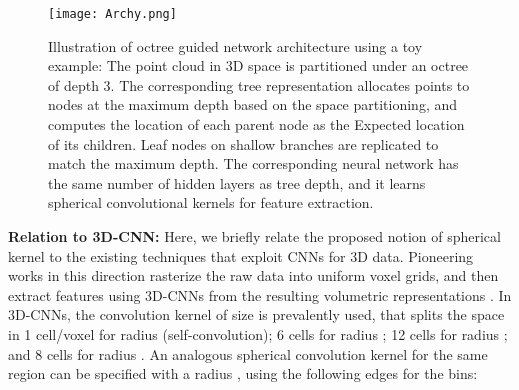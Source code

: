 \documentclass[10pt,twocolumn,letterpaper]{article}
\begin{document}
\begin{comment}
\begin{figure}
  \centering
   {\texttt{[image: lemma\_examples.png]}\label{LemmaExamples}}
  \caption{{\color{blue}Examples of divisions that violate the asymmetry. Here the red cross  represents the target point, while the green cross  is one of its neighborhood. The magenta sphere represents the spherical neighborhood range of , and the black curves represent divisions along / directions.
  (a) The spherical space is not divided at all, which results in a single weight matrix to be defined in the kernel and applied to any two points  and  symmetrically. (b) 
  Let . There will be no divisions along the  direction, which results in a particular weight matrix to be symmetrically applied to 
  points  and  on the - or its parallels (the blue arrow line). (c) 
  Let , that is, . The  direction will be divided into two bins, which subtly results in   
points ,  on the - and its parallels to share weights in a certain bin with  symmetrically.}} 
\end{figure}
\end{comment}
\begin{figure*}
  \centering
 {\texttt{[image: Archy.png]}\label{octree}}
  \caption{Illustration of octree guided network architecture using a toy example: The point cloud in 3D space  is partitioned under an octree of depth 3. The corresponding tree representation allocates points to nodes at the maximum depth based on the  space partitioning, and computes the location of each parent node as the Expected location of its children. Leaf nodes on shallow branches are replicated to match the maximum depth.  The corresponding neural network has the same number of hidden layers as tree depth, and it learns spherical convolutional kernels for feature extraction.}
\label{fig:network}
  \vspace{-3mm}
\end{figure*}
\vspace{-3mm}
\noindent \textbf{Relation to 3D-CNN:}
Here, we briefly relate the proposed notion of spherical kernel  to the existing techniques that exploit CNNs for 3D data. Pioneering works in this direction  rasterize the raw  data into uniform voxel grids, and then
extract features using 3D-CNNs from the resulting volumetric representations \cite{maturana2015voxnet,wu20153d}. In 3D-CNNs, the convolution kernel of size  is prevalently used, that  splits the space in 1 cell/voxel for radius  (self-convolution); 6 cells for radius ;
  12 cells for radius ; and 8 cells for radius .
An analogous spherical convolution kernel for the same region can be specified with a radius , using the following edges for the bins:
 
\end{document}
